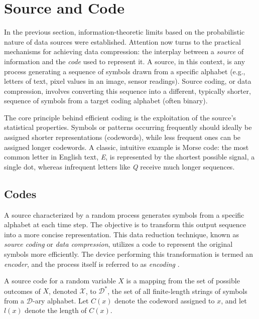 \section{Source and Code} \label{sec:source_and_codes}

\noindent In the previous section, information-theoretic limits based on the probabilistic nature of data sources were established. Attention now turns to the practical mechanisms for achieving data compression: the interplay between a \emph{source} of information and the \emph{code} used to represent it. A source, in this context, is any process generating a sequence of symbols drawn from a specific alphabet (e.g., letters of text, pixel values in an image, sensor readings). Source coding, or data compression, involves converting this sequence into a different, typically shorter, sequence of symbols from a target coding alphabet (often binary).

\noindent The core principle behind efficient coding is the exploitation of the source's statistical properties. Symbols or patterns occurring frequently should ideally be assigned shorter representations (codewords), while less frequent ones can be assigned longer codewords. A classic, intuitive example is Morse code: the most common letter in English text, \emph{E}, is represented by the shortest possible signal, a single dot, whereas infrequent letters like \emph{Q} receive much longer sequences.

\subsection{Codes}

A source characterized by a random process generates symbols from a specific alphabet at each time step. The objective is to transform this output sequence into a more concise representation. This data reduction technique, known as \emph{source coding} or \emph{data compression}, utilizes a code to represent the original symbols more efficiently. The device performing this transformation is termed an \emph{encoder}, and the process itself is referred to as \emph{encoding} \cite{han2002mathematics}.

\begin{definition}\label{def:code}
    A source code for a random variable $X$ is a mapping from the set of possible outcomes of $X$, denoted $\mathcal{X}$, to $\mathcal{D}^*$, the set of all finite-length strings of symbols from a $\mathcal{D}$-ary alphabet. Let $C(x)$ denote the codeword assigned to $x$, and let $l(x)$ denote the length of $C(x)$.
\end{definition}

